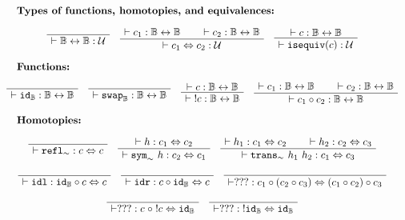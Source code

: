 \documentclass[format=acmlarge,review,natbib]{acmart}
\newcommand{\invc}[1]{!#1}
\newcommand{\compc}{\circ}
\newcommand{\reflh}{\mathtt{refl}_{\sim}}
\newcommand{\symh}[1]{\mathtt{sym}_{\sim}~#1}
\newcommand{\transh}[2]{\mathtt{trans}_{\sim}~#1~#2}
\newcommand{\isequiv}[1]{\mathtt{isequiv}(#1)}
\newcommand{\idc}{\mathtt{id}}
\newcommand{\swapc}{\mathtt{swap}}
\newcommand{\idlc}{\mathtt{idl}}
\newcommand{\idrc}{\mathtt{idr}}
\newcommand{\iso}{\leftrightarrow}
\newcommand{\isotwo}{\Leftrightarrow}
\newcommand{\boolt}{\mathbb{B}}
\newcommand{\univ}{\mathcal{U}}
\newcommand{\proves}{\vdash}
\newcommand{\jdg}[3]{#1 \proves #2 : #3}
\begin{document}
\[
  \begin{array}{c}
    \noalign{\textbf{Types of functions, homotopies, and equivalences:}} \\
    \AxiomC{}
    \UnaryInfC{$\jdg{}{\boolt\iso\boolt}{\univ}$}
    \DisplayProof
    \quad
    \AxiomC{$\jdg{}{c_1}{\boolt\iso\boolt}$}
    \AxiomC{$\jdg{}{c_2}{\boolt\iso\boolt}$}
    \BinaryInfC{$\jdg{}{c_1 \isotwo c_2}{\univ}$}
    \DisplayProof
    \quad
    \AxiomC{$\jdg{}{c}{\boolt\iso\boolt}$}
    \UnaryInfC{$\jdg{}{\isequiv{c}}{\univ}$}
    \DisplayProof
    \\
    \\
    \noalign{\textbf{Functions:}} \\
    \AxiomC{}
    \UnaryInfC{$\jdg{}{\idc_{\boolt}}{\boolt\iso\boolt}$}
    \DisplayProof
    \quad
    \AxiomC{}
    \UnaryInfC{$\jdg{}{\swapc_{\boolt}}{\boolt\iso\boolt}$}
    \DisplayProof
    \quad
    \AxiomC{$\jdg{}{c}{\boolt\iso\boolt}$}
    \UnaryInfC{$\jdg{}{\;\invc{c}}{\boolt\iso\boolt}$}
    \DisplayProof
    \quad
    \AxiomC{$\jdg{}{c_1}{\boolt\iso\boolt}$}
    \AxiomC{$\jdg{}{c_2}{\boolt\iso\boolt}$}
    \BinaryInfC{$\jdg{}{c_1 \compc c_2}{\boolt\iso\boolt}$}
    \DisplayProof
    \\
    \\
    \noalign{\textbf{Homotopies:}} \\
    \AxiomC{}
    \UnaryInfC{$\jdg{}{\reflh}{c \isotwo c}$}
    \DisplayProof
    \quad
    \AxiomC{$\jdg{}{h}{c_1 \isotwo c_2}$}
    \UnaryInfC{$\jdg{}{\symh{h}}{c_2 \isotwo c_1}$}
    \DisplayProof
    \quad
    \AxiomC{$\jdg{}{h_1}{c_1 \isotwo c_2}$}
    \AxiomC{$\jdg{}{h_2}{c_2 \isotwo c_3}$}
    \BinaryInfC{$\jdg{}{\transh{h_1}{h_2}}{c_1 \isotwo c_3}$}
    \DisplayProof
    \\
    \\
    \AxiomC{}
    \UnaryInfC{$\jdg{}{\idlc}{\idc_{\boolt} \compc c \isotwo c}$}
    \DisplayProof
    \quad
    \AxiomC{}
    \UnaryInfC{$\jdg{}{\idrc}{c \compc \idc_{\boolt} \isotwo c}$}
    \DisplayProof
    \quad
    \AxiomC{}
    \UnaryInfC{$\jdg{}{???}{c_1 \compc (c_2 \compc c_3) \isotwo (c_1 \compc c_2) \compc c_3}$}
    \DisplayProof
    \\
    \\
    \quad
    \AxiomC{}
    \UnaryInfC{$\jdg{}{???}{c \;\compc \;\invc{c} \isotwo \idc_{\boolt}}$}
    \DisplayProof
    \quad
    \AxiomC{}
    \UnaryInfC{$\jdg{}{???}{\;\invc{\idc_{\boolt}} \isotwo \idc_{\boolt}}$}
    \DisplayProof
    \quad
    \AxiomC{}
    \UnaryInfC{$\jdg{}{???}{\;\invc{\swapc_{\boolt}} \isotwo \swapc_{\boolt}}$}

\end{array}\]
\end{document}
